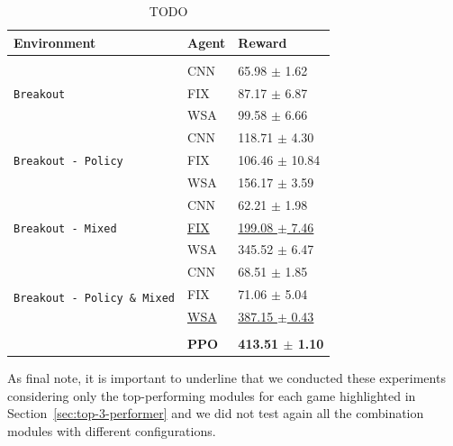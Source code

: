 \begin{table}[ht]
\centering
    \begin{tabular}[b]{lll}
                \multicolumn{1}{l}{Environment}  &\multicolumn{1}{l}{\textbf{Agent}} &\multicolumn{1}{l}{\textbf{Reward}} \\
                \hline \\


                \multirow{3}{*}{\texttt{Breakout}}
                                      & CNN & 65.98 $\pm$ 1.62 \\
                                      & FIX & 87.17 $\pm$ 6.87 \\
                                      & WSA & 99.58 $\pm$ 6.66 \\

                \multirow{3}{*}{\texttt{Breakout - Policy}}
                                      & CNN & 118.71 $\pm$ 4.30 \\
                                      & FIX & 106.46 $\pm$ 10.84 \\
                                      & WSA & 156.17 $\pm$ 3.59 \\

                \multirow{3}{*}{\texttt{Breakout - Mixed}}
                                      & CNN & 62.21 $\pm$ 1.98 \\
                                      & \underline{FIX} & \underline{199.08 $\pm$ 7.46}\\
                                      & WSA & 345.52 $\pm$ 6.47 \\

                \multirow{4}{*}{\texttt{Breakout - Policy \& Mixed}}
                                      & CNN & 68.51 $\pm$ 1.85 \\
                                      & FIX & 71.06 $\pm$ 5.04 \\
                                      & \underline{WSA} & \underline{387.15 $\pm$ 0.43} \\ \\


                                      & \textbf{PPO} & \textbf{413.51 $\pm$ 1.10}\\
    \end{tabular}
    \caption{TODO}
    \label{tab:breakout_results}
\end{table}

As final note, it is important to underline that we conducted these experiments considering only the top-performing modules for each game highlighted in Section~\ref{sec:top-3-performer} and we did not test again all the combination modules with different configurations.


